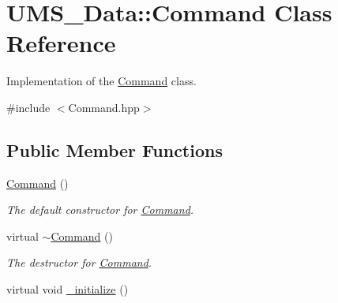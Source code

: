 \hypertarget{classUMS__Data_1_1Command}{
\section{UMS\_\-Data::Command Class Reference}
\label{classUMS__Data_1_1Command}
}


Implementation of the \hyperlink{classUMS__Data_1_1Command}{Command} class.  




{\ttfamily \#include $<$Command.hpp$>$}

\subsection*{Public Member Functions}
\begin{DoxyCompactItemize}
\item 
\hypertarget{classUMS__Data_1_1Command_afc8a5a253ce25ddccc64e6af69d8e93b}{
\hyperlink{classUMS__Data_1_1Command_afc8a5a253ce25ddccc64e6af69d8e93b}{Command} ()}
\label{classUMS__Data_1_1Command_afc8a5a253ce25ddccc64e6af69d8e93b}

\begin{DoxyCompactList}\small\item\em The default constructor for \hyperlink{classUMS__Data_1_1Command}{Command}. \item\end{DoxyCompactList}\item 
\hypertarget{classUMS__Data_1_1Command_a4153eba5fb0f247b7d3fda0420b9f183}{
virtual \hyperlink{classUMS__Data_1_1Command_a4153eba5fb0f247b7d3fda0420b9f183}{$\sim$Command} ()}
\label{classUMS__Data_1_1Command_a4153eba5fb0f247b7d3fda0420b9f183}

\begin{DoxyCompactList}\small\item\em The destructor for \hyperlink{classUMS__Data_1_1Command}{Command}. \item\end{DoxyCompactList}\item 
\hypertarget{classUMS__Data_1_1Command_aea1c7b8bdcfc8377a287ffbe79e25250}{
virtual void \hyperlink{classUMS__Data_1_1Command_aea1c7b8bdcfc8377a287ffbe79e25250}{\_\-initialize} ()}
\label{classUMS__Data_1_1Command_aea1c7b8bdcfc8377a287ffbe79e25250}


\end{DoxyCompactItemize}
